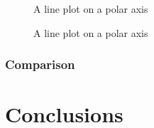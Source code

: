 \documentclass[
]{article}
\begin{document}
\begin{figure}


\caption{\label{fig-polar2}A line plot on a polar axis}

\end{figure}%

\begin{figure}


\caption{\label{fig-polar1}A line plot on a polar axis}

\end{figure}%

\subsubsection{Comparison}\label{comparison}

\section{Conclusions}\label{conclusions}
\end{document}
